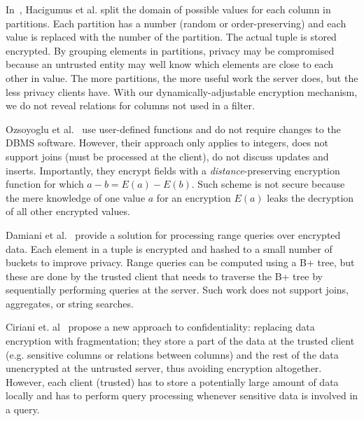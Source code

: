 In~\cite{sqlOverEncryption}, Hacigumus et al. split the domain of
possible values for each column in partitions. Each partition has a
number (random or order-preserving) and each value is replaced with
the number of the partition.  The actual tuple is stored
encrypted.  By grouping elements in
partitions, privacy may be compromised because an untrusted entity may
well know which elements are close to each other in value. The more partitions, the more useful work the server does,
but the less privacy clients have. With our
dynamically-adjustable encryption mechanism, we do not reveal relations for
columns not used in a filter.


Ozsoyoglu et al.~\cite{Ozsoyoglu03anti-tamperdatabases} use
user-defined functions and do not require changes to the DBMS
software. However, their approach only applies to integers, does not
support joins (must be processed at the client), do not discuss
updates and inserts.  Importantly, they  encrypt fields with a
\textit{distance}-preserving encryption function for which $a-b = E(a) -
E(b)$. Such scheme is not secure because the mere knowledge of one
value $a$ for an encryption $E(a)$ leaks the decryption of all other encrypted
values.

Damiani et al.~\cite{damianiIndex} provide a solution for processing
range queries over encrypted data.  Each element in a tuple is
encrypted and hashed to a small number of buckets to improve
privacy. Range queries can be computed using a B+ tree, but these are
done by the trusted client that needs to traverse the B+ tree by
sequentially performing queries at the server. Such work does not
support joins, aggregates, or string searches.


Ciriani et. al~\cite{Ciriani09keepafew} propose a new approach to
confidentiality: replacing data encryption with fragmentation; they
store a part of the data at the trusted client (e.g. sensitive columns
or relations between columns) and the rest of the data unencrypted at
the untrusted server, thus avoiding encryption altogether. However,
each client (trusted) has to store a potentially large amount of data
locally and has to perform query processing whenever sensitive data is
involved in a query. 

